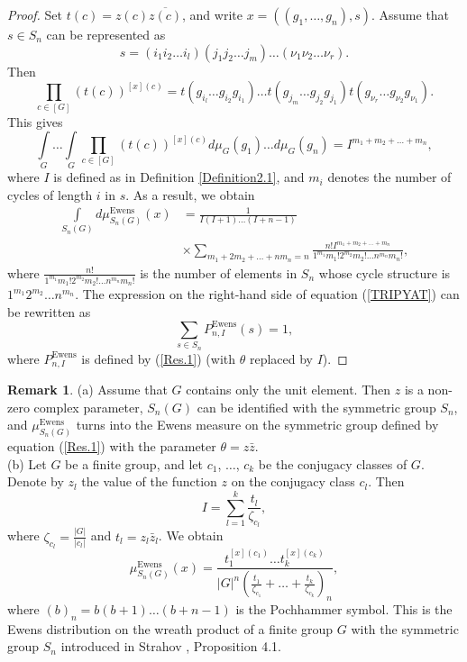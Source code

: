 \documentclass[12pt]{amsart}
\theoremstyle{definition}
\newtheorem{rem}[thm]{Remark}
\numberwithin{equation}{section}
\DeclareMathOperator{\Ewens}{Ewens}
\begin{document}
\begin{proof}Set $t(c)=z(c)\overline{z(c)}$, and write $x=\left(\left(g_1,\ldots,g_n\right),s\right)$. Assume that
$s\in S_n$ can be represented as
$$
s=\left(i_1i_2\ldots i_l\right)\left(j_1j_2\ldots j_m\right)\ldots\left(\nu_1\nu_2\ldots\nu_r\right).
$$
Then
$$
\prod\limits_{c\in\left[G\right]}\left(t(c)\right)^{[x](c)}=
t\left(g_{i_l}\ldots g_{i_2}g_{i_1}\right)\ldots
t\left(g_{j_m}\ldots g_{j_2}g_{j_1}\right)t\left(g_{\nu_r}\ldots g_{\nu_2}g_{\nu_1}\right).
$$
This gives
\begin{equation}
\int\limits_{G}\ldots\int\limits_{G}\prod\limits_{c\in\left[G\right]}
\left(t(c)\right)^{[x](c)}d\mu_{G}(g_1)\ldots d\mu_G(g_n)= I^{m_1+m_2+\ldots+m_n},
\end{equation}
where $I$ is defined as in Definition \ref{Definition2.1},
and $m_i$ denotes the number of cycles of length $i$ in $s$. As a result, we obtain
\begin{equation}\label{TRIPYAT}
\begin{split}
\int\limits_{S_n\left(G\right)}d\mu^{\Ewens}_{S_n\left(G\right)}(x)&=
\frac{1}{I(I+1)\ldots (I+n-1)}\\
&\times\sum\limits_{m_1+2m_2+\ldots+nm_n=n}
\frac{n!I^{m_1+m_2+\ldots+m_n}}{1^{m_1}m_1!2^{m_2}m_2!\ldots n^{m_n}m_n!},
\end{split}
\end{equation}
where $\frac{n!}{1^{m_1}m_1!2^{m_2}m_2!\ldots n^{m_n}m_n!}$ is the number of elements in $S_n$ whose cycle structure is $1^{m_1}2^{m_2}\ldots n^{m_n}$.
The expression on the right-hand side of equation (\ref{TRIPYAT}) can be rewritten as
$$
\sum\limits_{s\in S_n}P_{n,I}^{\Ewens}(s)=1,
$$
where $P^{\Ewens}_{n,I}$ is defined by (\ref{Res.1}) (with $\theta$ replaced by $I$).
\end{proof}
\begin{rem}
(a) Assume that $G$ contains only the unit element. Then $z$ is a non-zero complex parameter, $S_n(G)$ can be identified with the symmetric group $S_n$, and $\mu_{S_n(G)}^{\Ewens}$ turns into the Ewens measure on the symmetric group defined by equation (\ref{Res.1}) with the parameter $\theta=z\bar{z}$.\\
(b) Let $G$ be a finite group, and let $c_1$, $\ldots$, $c_k$ be the conjugacy classes of $G$. Denote by $z_l$ the value of the function $z$ on the conjugacy class $c_l$.
Then
$$
I=\sum\limits_{l=1}^k\frac{t_l}{\zeta_{c_l}},
$$
where $\zeta_{c_l}=\frac{|G|}{|c_l|}$ and $t_l=z_l\bar{z}_l$.  We obtain
$$
\mu_{S_n(G)}^{\Ewens}(x)=\frac{t_1^{[x](c_1)}\ldots t_k^{[x](c_k)}}{|G|^n
\left(\frac{t_1}{\zeta_{c_1}}+\ldots+\frac{t_k}{\zeta_{c_k}}\right)_n},
$$
where $(b)_n=b(b+1)\ldots(b+n-1)$ is the Pochhammer symbol.
This is the Ewens distribution on the wreath product of a finite group $G$ with the symmetric group $S_n$ introduced in Strahov \cite{StrahovMPS}, Proposition 4.1.
\end{rem}
\end{document}
